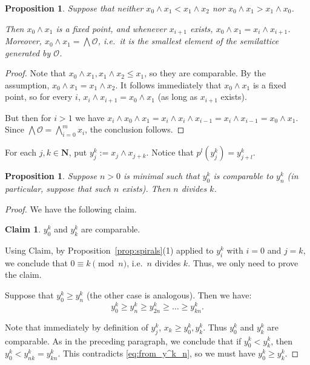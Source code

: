 \documentclass[final,a4paper,12pt,reqno]{amsart}
\newcommand{\bN}{{\mathbf{N}}}
\newcommand{\meet}{\mathop{\wedge}}
\newcommand{\bigmeet}{\bigwedge}
\newtheorem{prop}[thm]{Proposition}
\theoremstyle{remark}
\theoremstyle{definition}
\newtheorem*{clm*}{Claim}
\newenvironment{clmproof}[1][\proofname]{\proof[#1]\renewcommand{\qedsymbol}{$\square$(claim)}}{\endproof}
\let \leq \leqslant
\let \geq \geqslant
\begin{document}
	
	\begin{prop}
		\label{prop:meet_of_two}
		Suppose that neither $x_0\meet x_1<x_1\meet x_2$ nor $x_0\meet x_1>x_1\meet x_0$.
		
		Then $x_0\meet x_1$ is a fixed point, and whenever $x_{i+1}$ exists, $x_0\meet x_1=x_i\meet x_{i+1}$. Moreover, $x_0\meet x_1=\bigmeet \mathcal O$, i.e.\ it is the smallest element of the semilattice generated by $\mathcal O$.
	\end{prop}
	\begin{proof}
		Note that $x_0\meet x_1,x_1\meet x_2\leq x_1$, so they are comparable. By the assumption, $x_0\meet x_1=x_1\meet x_2$. It follows immediately that $x_0\meet x_1$ is a fixed point, so for every $i$, $x_i\meet x_{i+1}=x_0\meet x_1$ (as long as $x_{i+1}$ exists).
		
		But then for $i>1$ we have $x_i\meet x_0\meet x_1=x_i\meet x_i\meet x_{i-1}=x_i\meet x_{i-1}=x_0\meet x_1$. Since $\bigwedge \mathcal O=\bigwedge_{i=0}^m x_i$, the conclusion follows.
	\end{proof}
	
	For each $j,k\in \bN$, put $y^k_j:=x_j\meet x_{j+k}$. Notice that $p^l(y^k_j)=y^k_{j+l}$.
	\begin{prop}
		\label{prop:minimal_n_divides_k}
		Suppose $n>0$ is minimal such that $y^k_0$ is comparable to $y^k_{n}$ (in particular, suppose that such $n$ exists). Then $n$ divides $k$.
	\end{prop}
	\begin{proof}
		We have the following claim.
		
		\begin{clm*}
			$y^k_0$ and $y^k_k$ are comparable.
		\end{clm*}
		
		Using Claim, by Proposition~\ref{prop:spirals}(1) applied to $y^k_i$ with $i=0$ and $j=k$, we conclude that $0\equiv k\pmod n$, i.e.\ $n$ divides $k$. Thus, we only need to prove the claim.
		
		\begin{clmproof}[Proof of claim]
			Suppose that $y^k_0\geq y^k_n$ (the other case is analogous). Then  we have:
			\begin{equation}
				\label{eq:from_y^k_n}
				y^k_0\geq y^k_n\geq y^k_{2n}\geq \ldots \geq y^k_{kn}.
			\end{equation}
			
			Note that immediately by definition of $y^k_j$, $x_k\geq y^k_0,y^k_k$. Thus $y^k_0$ and $y^k_k$ are comparable. As in the preceding paragraph, we conclude that if $y^k_0<y^k_k$, then $y^k_0<y^k_{nk}=y^k_{kn}$. This contradicts \eqref{eq:from_y^k_n}, so we must have $y^k_0\geq y^k_k$.
		\end{clmproof}
	\end{proof}
	
\end{document}
